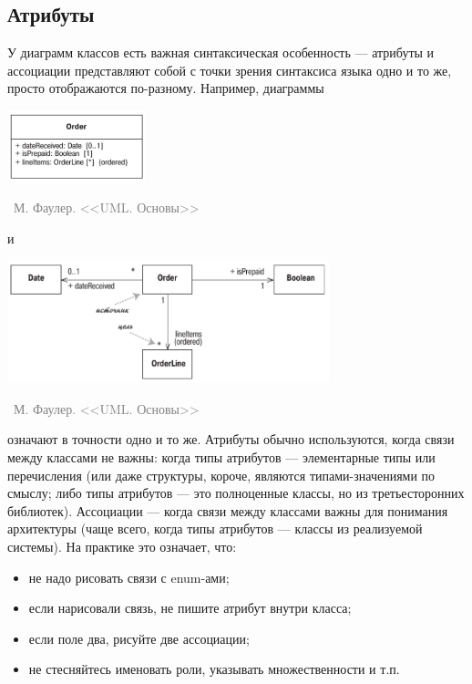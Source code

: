 \documentclass[a5paper]{article}
\newcommand{\attribution}[1] {
    \vspace{-5mm}\begin{flushright}\begin{scriptsize}\textcolor{gray}{\textcopyright\, #1}\end{scriptsize}\end{flushright}
}
\begin{document}
\subsection{Атрибуты}

У диаграмм классов есть важная синтаксическая особенность --- атрибуты и ассоциации представляют собой с точки зрения синтаксиса языка одно и то же, просто отображаются по-разному. Например, диаграммы

\begin{center}
    \includegraphics[width=0.3\textwidth]{attributes.png}
    \attribution{М. Фаулер. <<UML. Основы>>}
\end{center}

и

\begin{center}
    \includegraphics[width=0.7\textwidth]{associations.png}
    \attribution{М. Фаулер. <<UML. Основы>>}
\end{center}

означают в точности одно и то же. Атрибуты обычно используются, когда связи между классами не важны: когда типы атрибутов --- элементарные типы или перечисления (или даже структуры, короче, являются типами-значениями по смыслу; либо типы атрибутов --- это полноценные классы, но из третьесторонних библиотек). Ассоциации --- когда связи между классами важны для понимания архитектуры (чаще всего, когда типы атрибутов --- классы из реализуемой системы). На практике это означает, что:

\begin{itemize}
    \item не надо рисовать связи с enum-ами;
    \item если нарисовали связь, не пишите атрибут внутри класса;
    \item если поле два, рисуйте две ассоциации;
    \item не стесняйтесь именовать роли, указывать множественности и т.п.
\end{itemize}
\end{document}
